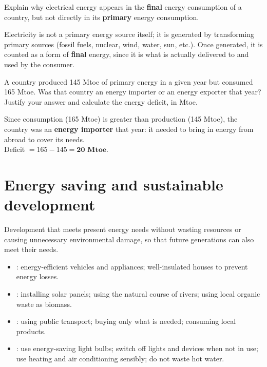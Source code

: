\begin{exercise}
    Explain why electrical energy appears in the \textbf{final} energy consumption of a country, but not directly in its \textbf{primary} energy consumption.
    \begin{solu}
        Electricity is not a primary energy source itself; it is generated by transforming primary sources (fossil fuels, nuclear, wind, water, sun, etc.). Once generated, it is counted as a form of \textbf{final} energy, since it is what is actually delivered to and used by the consumer.
    \end{solu}
\end{exercise}

\begin{exercise}
    A country produced 145 Mtoe of primary energy in a given year but consumed 165 Mtoe. Was that country an energy importer or an energy exporter that year? Justify your answer and calculate the energy deficit, in Mtoe.
    \begin{solu}
        Since consumption (165 Mtoe) is greater than production (145 Mtoe), the country was an \textbf{energy importer} that year: it needed to bring in energy from abroad to cover its needs. \\
        Deficit \(= 165 - 145 = \textbf{20 Mtoe}\).
    \end{solu}
\end{exercise}


\section{Energy saving and sustainable development}

\begin{definition}
    Development that meets present energy needs without wasting resources or causing unnecessary environmental damage, so that future generations can also meet their needs.
\end{definition}

\begin{itemize}
    \item {}: energy-efficient vehicles and appliances; well-insulated houses to prevent energy losses.
    \item {}: installing solar panels; using the natural course of rivers; using local organic waste as biomass.
    \item {}: using public transport; buying only what is needed; consuming local products.
    \item {}: use energy-saving light bulbs; switch off lights and devices when not in use; use heating and air conditioning sensibly; do not waste hot water.
\end{itemize}

